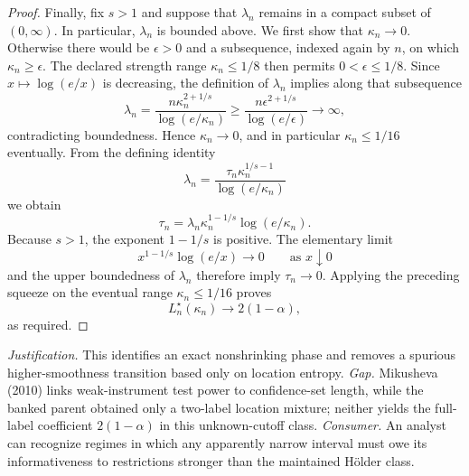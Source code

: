 \documentclass{article}
\begin{document}
\begin{proof}
Finally, fix \(s>1\) and suppose that \(\lambda_n\) remains in a
compact subset of \((0,\infty)\).  In particular, \(\lambda_n\) is
bounded above.  We first show that \(\kappa_n\to0\).  Otherwise there
would be \(\epsilon>0\) and a subsequence, indexed again by \(n\), on
which \(\kappa_n\ge\epsilon\).  The declared strength range
\(\kappa_n\le1/8\) then permits \(0<\epsilon\le1/8\).  Since
\(x\mapsto\log(e/x)\) is decreasing, the definition of \(\lambda_n\)
implies along that subsequence
\[
 \lambda_n
 =\frac{n\kappa_n^{2+1/s}}{\log(e/\kappa_n)}
 \ge
 \frac{n\epsilon^{2+1/s}}{\log(e/\epsilon)}
 \longrightarrow\infty,
\]
contradicting boundedness.  Hence \(\kappa_n\to0\), and in particular
\(\kappa_n\le1/16\) eventually.  From the defining identity
\[
 \lambda_n
 =\frac{\tau_n\kappa_n^{1/s-1}}{\log(e/\kappa_n)}
\]
we obtain
\[
 \tau_n
 =\lambda_n\kappa_n^{1-1/s}\log(e/\kappa_n).
\]
Because \(s>1\), the exponent \(1-1/s\) is positive.  The elementary
limit
\[
 x^{1-1/s}\log(e/x)\longrightarrow0
 \qquad\text{as }x\downarrow0
\]
and the upper boundedness of \(\lambda_n\) therefore imply
\(\tau_n\to0\).  Applying the preceding squeeze on the eventual range
\(\kappa_n\le1/16\) proves
\[
 L_n^\star(\kappa_n)\longrightarrow2(1-\alpha),
\]
as required.
\end{proof}
\par\smallskip\noindent \textit{Justification.} This identifies an exact nonshrinking phase and removes a spurious higher-smoothness transition based only on location entropy. \textit{Gap.} Mikusheva (2010) links weak-instrument test power to confidence-set length, while the banked parent obtained only a two-label location mixture; neither yields the full-label coefficient \(2(1-\alpha)\) in this unknown-cutoff class. \textit{Consumer.} An analyst can recognize regimes in which any apparently narrow interval must owe its informativeness to restrictions stronger than the maintained H\"older class.
\end{document}
